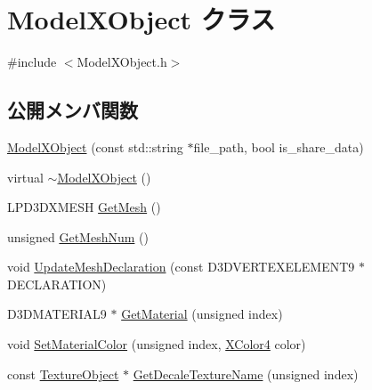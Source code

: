 \hypertarget{class_model_x_object}{}\section{Model\+X\+Object クラス}
\label{class_model_x_object}


{\ttfamily \#include $<$Model\+X\+Object.\+h$>$}

\subsection*{公開メンバ関数}
\begin{DoxyCompactItemize}
\item 
\mbox{\hyperlink{class_model_x_object_a83bd334b1f24a69c4cbdcaa62464ff31}{Model\+X\+Object}} (const std\+::string $\ast$file\+\_\+path, bool is\+\_\+share\+\_\+data)
\item 
virtual \mbox{\hyperlink{class_model_x_object_a33553f8ab78dfd3c9d571a048ae85324}{$\sim$\+Model\+X\+Object}} ()
\item 
L\+P\+D3\+D\+X\+M\+E\+SH \mbox{\hyperlink{class_model_x_object_a3aaab083fe6e1956b2eaab815ebb4bfb}{Get\+Mesh}} ()
\item 
unsigned \mbox{\hyperlink{class_model_x_object_a8e91c6bda6b00055bae0707037d81d9f}{Get\+Mesh\+Num}} ()
\item 
void \mbox{\hyperlink{class_model_x_object_ac005f3f164a1f75d6cfc0772e2e95382}{Update\+Mesh\+Declaration}} (const D3\+D\+V\+E\+R\+T\+E\+X\+E\+L\+E\+M\+E\+N\+T9 $\ast$D\+E\+C\+L\+A\+R\+A\+T\+I\+ON)
\item 
D3\+D\+M\+A\+T\+E\+R\+I\+A\+L9 $\ast$ \mbox{\hyperlink{class_model_x_object_a27df4304e87da11e2f9c9d7a8487a985}{Get\+Material}} (unsigned index)
\item 
void \mbox{\hyperlink{class_model_x_object_acc6b5f187b74b421451c8c2c7c2964d7}{Set\+Material\+Color}} (unsigned index, \mbox{\hyperlink{_vector3_d_8h_a680c30c4a07d86fe763c7e01169cd6cc}{X\+Color4}} color)
\item 
const \mbox{\hyperlink{class_texture_object}{Texture\+Object}} $\ast$ \mbox{\hyperlink{class_model_x_object_afd57d5b6b74817f4d69047640e69f14e}{Get\+Decale\+Texture\+Name}} (unsigned index)
\end{DoxyCompactItemize}
